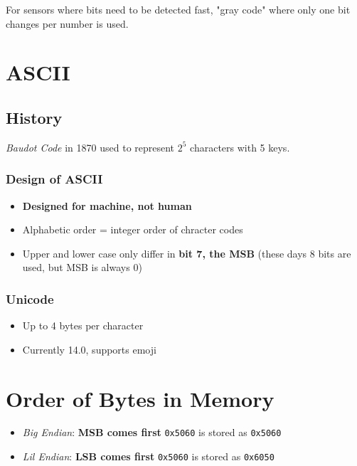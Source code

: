 \documentclass[11pt]{article}
\begin{document}
For sensors where bits need to be detected fast, "gray code" where only one bit changes per number is used.

\section{ASCII}
\label{sec:orgc5b91d2}

\subsection{History}
\label{sec:orgabf03a5}

\emph{Baudot Code} in 1870 used to represent \(2^5\) characters with 5 keys.

\subsubsection{Design of ASCII}
\label{sec:org9e41958}

\begin{itemize}
\item \textbf{Designed for machine, not human}
\item Alphabetic order = integer order of chracter codes
\item Upper and lower case only differ in \textbf{bit 7, the MSB} (these days 8 bits are used, but MSB is always 0)
\end{itemize}

\subsubsection{Unicode}
\label{sec:org4741de9}

\begin{itemize}
\item Up to 4 bytes per character
\item Currently 14.0, supports emoji
\end{itemize}

\section{Order of Bytes in Memory}
\label{sec:org7197dc1}

\begin{itemize}
\item \emph{Big Endian}: \textbf{MSB comes first}
\texttt{0x5060} is stored as \texttt{0x5060}
\item \emph{Lil Endian}: \textbf{LSB comes first}
\texttt{0x5060} is stored as \texttt{0x6050}
\end{itemize}
\end{document}
